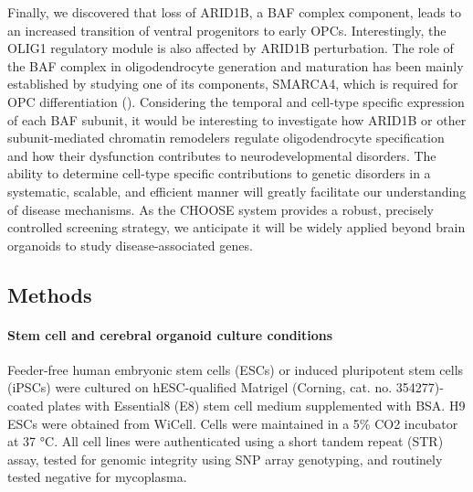 Finally, we discovered that loss of ARID1B, a BAF complex component, leads to an increased transition of ventral progenitors to early OPCs.  Interestingly, the OLIG1 regulatory module is also affected by ARID1B perturbation. The role of the BAF complex in oligodendrocyte generation and maturation has been mainly established by studying one of its components, SMARCA4, which is required for OPC differentiation (\cite{yu_olig2_2013}). Considering the temporal and cell-type specific expression of each BAF subunit, it would be interesting to investigate how ARID1B or other subunit-mediated chromatin remodelers regulate oligodendrocyte specification and how their dysfunction contributes to neurodevelopmental disorders.
The ability to determine cell-type specific contributions to genetic disorders in a systematic, scalable, and efficient manner will greatly facilitate our understanding of disease mechanisms. As the CHOOSE system provides a robust, precisely controlled screening strategy, we anticipate it will be widely applied beyond brain organoids to study disease-associated genes. 


\subsection{Methods}


\paragraph{Stem cell and cerebral organoid culture conditions}
Feeder-free human embryonic stem cells (ESCs) or induced pluripotent stem cells (iPSCs) were cultured on hESC-qualified Matrigel (Corning, cat. no. 354277)-coated plates with Essential8 (E8) stem cell medium supplemented with BSA. H9 ESCs were obtained from WiCell. Cells were maintained in a 5\% CO2 incubator at 37 °C. All cell lines were authenticated using a short tandem repeat (STR) assay, tested for genomic integrity using SNP array genotyping, and routinely tested negative for mycoplasma.



